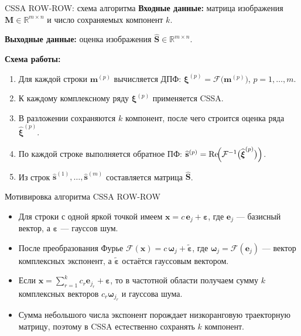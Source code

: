 \documentclass[unicode,notheorems]{beamer}
\begin{document}
\begin{frame}{CSSA ROW-ROW: схема алгоритма}
	\small
	\textbf{Входные данные:} матрица изображения $\mathbf{M}\in\mathbb{R}^{m\times n}$
	и число сохраняемых компонент $k$.

	\textbf{Выходные данные:} оценка изображения $\widehat{\mathbf{S}}\in\mathbb{R}^{m\times n}$.

	\vspace{0.2cm}
	\textbf{Схема работы:}
	\begin{enumerate}
		\item Для каждой строки $\mathbf{m}^{(p)}$ вычисляется ДПФ:
		$\boldsymbol{\xi}^{(p)} = \mathcal{F}\bigl(\mathbf{m}^{(p)}\bigr)$, $p=1,\dots,m$.
		\item К каждому комплексному ряду $\boldsymbol{\xi}^{(p)}$ применяется CSSA.
		\item В разложении сохраняются $k$ компонент, после чего строится оценка ряда $\widehat{\boldsymbol{\xi}}^{(p)}$.
		\item По каждой строке выполняется обратное ПФ:
		$\widehat{\mathbf{s}}^{(p)} = \operatorname{Re}\!\Bigl(\mathcal{F}^{-1}\bigl(\widehat{\boldsymbol{\xi}}^{(p)}\bigr)\Bigr)$.
		\item Из строк $\widehat{\mathbf{s}}^{(1)},\dots,\widehat{\mathbf{s}}^{(m)}$ составляется матрица $\widehat{\mathbf{S}}$.
	\end{enumerate}
\end{frame}

\begin{frame}{Мотивировка алгоритма CSSA ROW-ROW}
	\small
	\begin{itemize}
		\item Для строки с одной яркой точкой имеем
		$\mathbf{x} = c\,\mathbf{e}_j + \boldsymbol{\varepsilon}$,
		где $\mathbf{e}_j$ --- базисный вектор, а $\boldsymbol{\varepsilon}$ --- гауссов шум.
		\item После преобразования Фурье
		$\mathcal{F}(\mathbf{x}) = c\,\boldsymbol{\omega}_j + \widetilde{\boldsymbol{\varepsilon}}$,
		где $\boldsymbol{\omega}_j=\mathcal{F}(\mathbf{e}_j)$ --- вектор комплексных экспонент, а
		$\widetilde{\boldsymbol{\varepsilon}}$ остаётся гауссовым вектором.
		\item Если
		$\mathbf{x} = \sum_{r=1}^{k} c_r \mathbf{e}_{j_r} + \boldsymbol{\varepsilon}$,
		то в частотной области получаем сумму $k$ комплексных векторов $c_r\boldsymbol{\omega}_{j_r}$ и гауссова шума.
		\item Сумма небольшого числа экспонент порождает низкоранговую траекторную матрицу, поэтому в CSSA естественно сохранять $k$ компонент.
	\end{itemize}
\end{frame}
\end{document}
